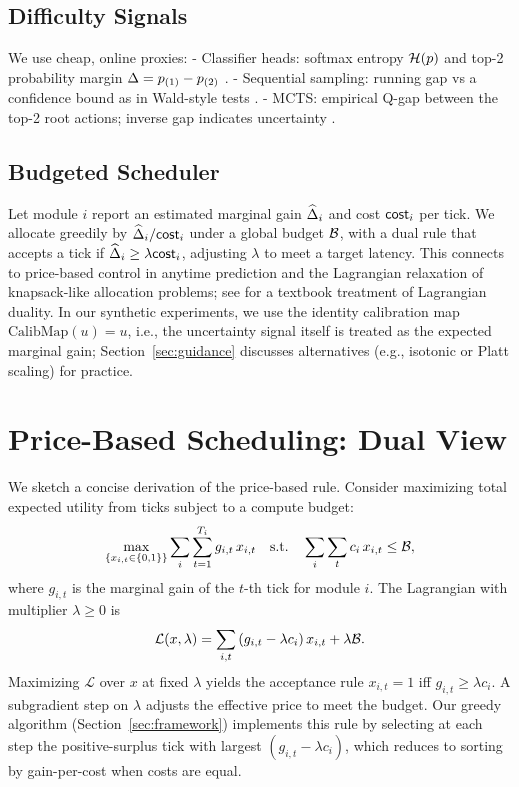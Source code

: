 \subsection{Difficulty Signals}
We use cheap, online proxies:
- Classifier heads: softmax entropy $\mathcal{H}(p)$ and top-2 probability margin $\Delta = p_{(1)}-p_{(2)}$ \cite{Kaya2019ShallowDeep,Guo2017Calibration}.
- Sequential sampling: running gap vs a confidence bound as in Wald-style tests \cite{Wald1945Sequential}.
- MCTS: empirical Q-gap between the top-2 root actions; inverse gap indicates uncertainty \cite{Kocsis2006UCT,Coulom2006MCTS}.

\subsection{Budgeted Scheduler}
Let module $i$ report an estimated marginal gain $\widehat{\Delta}_i$ and cost $\mathsf{cost}_i$ per tick. We allocate greedily by $\widehat{\Delta}_i/\mathsf{cost}_i$ under a global budget $\mathcal{B}$, with a dual rule that accepts a tick if $\widehat{\Delta}_i \ge \lambda \mathsf{cost}_i$, adjusting $\lambda$ to meet a target latency. This connects to price-based control in anytime prediction \cite{Graves2016ACT,Anthony2017ThinkingFast} and the Lagrangian relaxation of knapsack-like allocation problems; see \cite{BoydVandenberghe2004} for a textbook treatment of Lagrangian duality. In our synthetic experiments, we use the identity calibration map $\text{CalibMap}(u)=u$, i.e., the uncertainty signal itself is treated as the expected marginal gain; Section~\ref{sec:guidance} discusses alternatives (e.g., isotonic or Platt scaling) for practice.

\section{Price-Based Scheduling: Dual View}
\label{sec:dual}
We sketch a concise derivation of the price-based rule. Consider maximizing total expected utility from ticks subject to a compute budget:
\begin{equation*}
\max_{\{x_{i,t}\in\{0,1\}\}} \sum_{i} \sum_{t=1}^{T_i} g_{i,t} \, x_{i,t}
\quad\text{s.t.}\quad \sum_{i} \sum_{t} c_i \, x_{i,t} \le \mathcal{B},
\end{equation*}
where $g_{i,t}$ is the marginal gain of the $t$-th tick for module $i$. The Lagrangian with multiplier $\lambda \ge 0$ is
\begin{equation*}
\mathcal{L}(x,\lambda) = \sum_{i,t} \left(g_{i,t} - \lambda c_i\right) x_{i,t} + \lambda \mathcal{B}.
\end{equation*}
Maximizing $\mathcal{L}$ over $x$ at fixed $\lambda$ yields the acceptance rule $x_{i,t}=1$ iff $g_{i,t} \ge \lambda c_i$. A subgradient step on $\lambda$ adjusts the effective price to meet the budget. Our greedy algorithm (Section~\ref{sec:framework}) implements this rule by selecting at each step the positive-surplus tick with largest $(g_{i,t}-\lambda c_i)$, which reduces to sorting by gain-per-cost when costs are equal.

